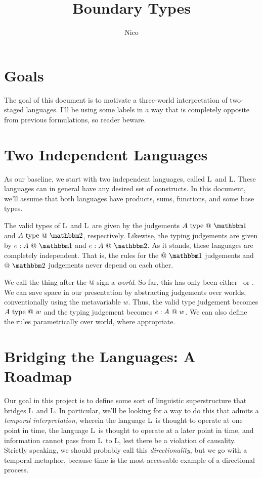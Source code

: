 \documentclass[]{article}
\title{Boundary Types}
\author{Nico}
\begin{document}
\maketitle

\section {Goals}

The goal of this document is to motivate a three-world interpretation of two-staged languages.
I'll be using some labels in a way that is completely opposite from previous formulations,
so reader beware.  

\section {Two Independent Languages}

As our baseline, we start with two independent languages, called L\bbone\ and L\bbtwo.
These languages can in general have any desired set of constructs.
In this document, we'll assume that both languages have products, sums, functions, and some base types.

The valid types of L\bbone\ and L\bbtwo\ are given by the judgements 
$A \istypeone$ and $A \istypetwo$, respectively.
Likewise, the typing judgements are given by
$\colone e A$ and $\coltwo e A$.
As it stands, these languages are completely independent.
That is, the rules for the $@~\bbone$ judgements and $@~\bbtwo$ judgements never depend on each other.

We call the thing after the $@$ sign a {\em world}.
So far, this has only been either \bbone\ or \bbtwo.
We can save space in our presentation by abstracting judgements over worlds,
conventionally using the metavariable $w$.
Thus, the valid type judgement becomes $A ~{\rm type}~@~w$ 
and the typing judgement becomes ${e}:{A}~@~w$.  
We can also define the rules parametrically over world, where appropriate.

\section{Bridging the Languages: A Roadmap}

Our goal in this project is to define some sort of linguistic superstructure that bridges L\bbone\ and L\bbtwo.
In particular, we'll be looking for a way to do this that admits a {\em temporal interpretation},
wherein the language L\bbone\ is thought to operate at one point in time, 
the language L\bbtwo\ is thought to operate at a later point in time, 
and information cannot pass from L\bbtwo\ to L\bbone, 
lest there be a violation of causality.
Strictly speaking, we should probably call this {\em directionality},
but we go with a temporal metaphor, because time is the most accessable example of a directional process.
\end{document}
